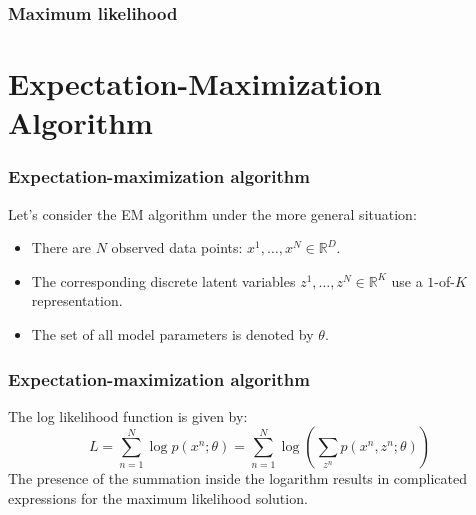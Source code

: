 \documentclass{beamer}
\begin{document}
\begin{frame}
    \frametitle{Maximum likelihood}
\end{frame}

\section{Expectation-Maximization Algorithm}

\begin{frame}
    \frametitle{Expectation-maximization algorithm}
    Let's consider the EM algorithm under the more general situation:
    \begin{itemize}
        \item There are $N$ observed data points: $x^{1},\hdots,x^{N}\in\mathbb{R}^{D}$.
        \item The corresponding discrete latent variables $z^{1},\hdots,z^{N}\in\mathbb{R}^{K}$ use a $1$-of-$K$ representation.
        \item The set of all model parameters is denoted by $\theta$.
    \end{itemize}
\end{frame}

\begin{frame}
    \frametitle{Expectation-maximization algorithm}
    The log likelihood function is given by:
    \begin{equation*}
        L=\sum_{n=1}^{N}\log{}p(x^{n};\theta)=\sum_{n=1}^{N}\log(\sum_{z^{n}}p(x^{n},z^{n};\theta))
    \end{equation*}
    The presence of the summation inside the logarithm results in complicated expressions for the maximum likelihood solution.
\end{frame}
\end{document}
